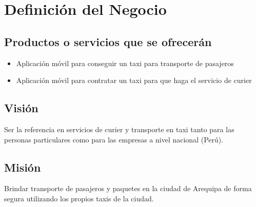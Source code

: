\chapter{Definición del Negocio}

\section{Productos o servicios que se ofrecerán}

\begin{itemize}
\item Aplicación móvil para conseguir un taxi para transporte de pasajeros 
\item Aplicación móvil para contratar un taxi para que haga el servicio de curier
\end{itemize}

\section{Visión}

Ser la referencia en servicios de curier y transporte en taxi tanto para las personas particulares como para las empresas a nivel nacional (Perú).

\section{Misión}

Brindar transporte de pasajeros y paquetes en la ciudad de Arequipa de forma segura utilizando los propios taxis de la ciudad.